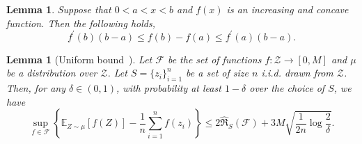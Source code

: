 \documentclass{article}
\theoremstyle{plain}
\theoremstyle{plain}
\newtheorem{lemma}[theorem]{Lemma}
\theoremstyle{definition}
\theoremstyle{remark}
\newcommand{\mbE}{\mathbb{E}}
\begin{document}

\begin{lemma}\label{lem: mean value}
    Suppose that $0<a<x<b$ and $f(x)$ is an increasing and concave function. Then the following holds,
    \begin{equation}
        f^{\prime}(b)(b-a)\leq f(b)-f(a)\leq f^{\prime}(a)(b-a).
    \end{equation}
\end{lemma}

\begin{lemma}[Uniform bound~\citep{mohri2018foundations}] \label{lem:uniform_bound}
  Let $\mathcal{F}$ be the set of functions $f:\mathcal{Z}\to[0,M]$  and 
  $\mu$ be a distribution over $\mathcal{Z}$.
  Let $S=\{z_i\}_{i=1}^n$ be a set of size $n$ i.i.d. drawn from $\mathcal{Z}$.
  Then, for any $\delta \in (0,1)$, with probability at least $1-\delta$ over the choice of $S$, we have
  \begin{equation*}
    \sup_{f \in \mathcal{F}} \left\{ \mbE_{Z\sim \mu}[f(Z)] - \frac{1}{n}\sum_{i=1}^n f(z_i) \right\} 
    \leq 2 \hat{\mathfrak{R}}_{S}(\mathcal{F}) + 3M \sqrt{\frac{1}{2n}\log\frac{2}{\delta}}.
  \end{equation*}
\end{lemma}
\end{document}

